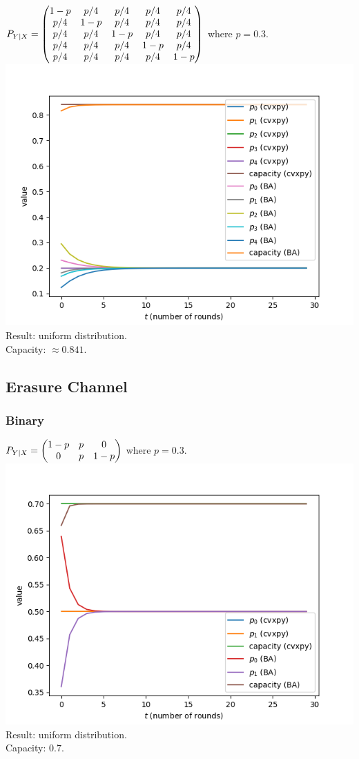 $P_{Y|X}=\begin{pmatrix}
1-p&p/4&p/4&p/4&p/4\\
p/4&1-p&p/4&p/4&p/4\\
p/4&p/4&1-p&p/4&p/4\\
p/4&p/4&p/4&1-p&p/4\\
p/4&p/4&p/4&p/4&1-p
\end{pmatrix}$ where $p=0.3$.\\
\includegraphics[width=15cm]{symmetric2.png}\\
Result: uniform distribution.\\
Capacity: $\approx 0.841$.

\subsection{Erasure Channel}

\subsubsection{Binary}

$P_{Y|X}=\begin{pmatrix}1-p&p&0\\0&p&1-p\end{pmatrix}$ where $p=0.3$.\\
\includegraphics[width=15cm]{erasure.png}\\
Result: uniform distribution.\\
Capacity: $0.7$.

